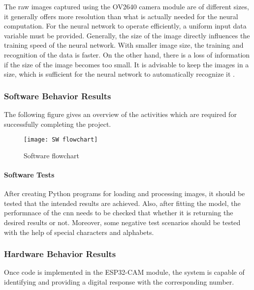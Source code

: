 The raw images captured using the OV2640 camera module are of different sizes, it generally offers more resolution than what is actually needed for the neural computation. For the neural network to operate efficiently, a uniform input data variable must be provided. Generally, the size of the image directly influences the training speed of the neural network. With smaller image size, the training and recognition of the data is faster. On the other hand, there is a loss of information if the size of the image becomes too small. It is advisable to keep the images in a size, which is sufficient for the neural network to automatically recognize it \autocite{MakeMedia2021-Part2}.

\subsubsection{Software Behavior Results}
The following figure  gives an overview of the activities which are required for successfully completing the project.

\begin{figure}  [H]
	\begin{center}
		\texttt{[image: SW flowchart]}
		\caption{Software flowchart} \label{fig:SWflowchart}
	\end{center}
\end{figure}

\paragraph{Software Tests}
After creating Python programs for loading and processing images, it should be tested that the intended results are achieved. Also, after fitting the model, the performnace of the \ac{cnn} needs to be checked that whether it is returning the desired results or not. Moreover, some negative test scenarios should be tested with the help of special characters and alphabets.

\subsubsection{Hardware Behavior Results}
Once code is implemented in the ESP32-CAM module, the system is capable of identifying and providing a digital response with the corresponding number. \\

